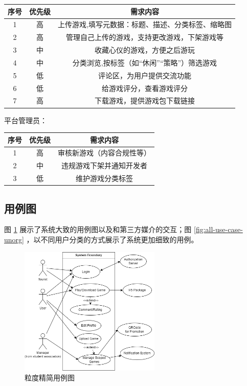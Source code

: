 \documentclass[12pt]{ctexart} %
\begin{document}
\begin{tabular}{|c|c|c|}
  \hline
  序号& 优先级& 需求内容\\
  \hline
  1 & 高& 上传游戏,填写元数据：标题、描述、分类标签、缩略图\\
  \hline
  2 & 高& 管理自己上传的游戏，支持更改游戏，下架游戏等\\
  \hline
  3 & 中& 收藏心仪的游戏，方便之后游玩\\
  \hline
  4 & 中& 分类浏览,按标签（如“休闲”“策略”）筛选游戏\\
  \hline
  5 & 低& 评论区，为用户提供交流功能\\
  \hline
  6 & 低& 给游戏评分，查看游戏评分\\
  \hline
  7 & 高& 下载游戏，提供游戏包下载链接\\
  \hline
\end{tabular}

\vspace{1cm}
平台管理员：

\begin{tabular}{|c|c|c|}
  \hline
  序号& 优先级& 需求内容\\
  \hline
  1 & 高& 审核新游戏（内容合规性等）\\
  \hline
  2 & 中& 违规游戏下架并通知开发者\\
  \hline
  3 & 低& 维护游戏分类标签\\
  \hline
\end{tabular}

\subsection{用例图}

图 \ref{fig:all-use-case-brief} 展示了系统大致的用例图以及和第三方媒介的交互；图 \ref{fig:all-use-case-unorg} ，以不同用户分类的方式展示了系统更加细致的用例。

\begin{figure}[htbp]
  \centering
  \includegraphics[width=0.6\textwidth]{all_use_case.png}
  \caption{粒度精简用例图}
  \label{fig:all-use-case-brief}
\end{figure}
\end{document}
